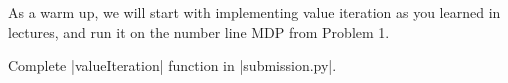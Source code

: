 \item {}

As a warm up, we will start with implementing value iteration as you learned in lectures, and run it on the number line MDP from Problem 1. 

Complete |valueIteration| function in |submission.py|.

